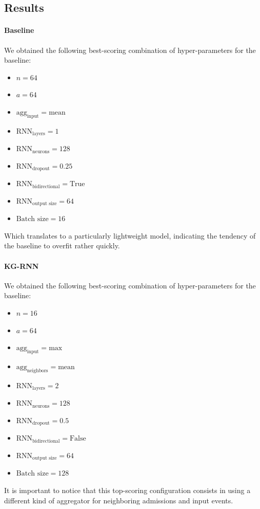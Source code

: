 \subsection{Results}
\paragraph{Baseline} We obtained the following best-scoring combination of hyper-parameters for the baseline:
\begin{itemize}
 \item $n = 64$
 \item $a = 64$
 \item $\mbox{agg}_{\mbox{input}} = \mbox{mean}$
 \item $\mbox{RNN}_{\mbox{layers}} = 1$
 \item $\mbox{RNN}_{\mbox{neurons}} = 128$
 \item $\mbox{RNN}_{\mbox{dropout}} = 0.25$
 \item $\mbox{RNN}_{\mbox{bidirectional}} = \mbox{True}$
 \item $\mbox{RNN}_{\mbox{output size}} = 64$
 \item $\mbox{Batch size} = 16$
\end{itemize}
Which translates to a particularly lightweight model, indicating the tendency of the baseline to overfit rather quickly.
\paragraph{KG-RNN} We obtained the following best-scoring combination of hyper-parameters for the baseline:
\begin{itemize}
 \item $n = 16$
 \item $a = 64$
 \item $\mbox{agg}_{\mbox{input}} = \mbox{max}$
 \item $\mbox{agg}_{\mbox{neighbors}} = \mbox{mean}$
 \item $\mbox{RNN}_{\mbox{layers}} = 2$
 \item $\mbox{RNN}_{\mbox{neurons}} = 128$
 \item $\mbox{RNN}_{\mbox{dropout}} = 0.5$
 \item $\mbox{RNN}_{\mbox{bidirectional}} = \mbox{False}$
 \item $\mbox{RNN}_{\mbox{output size}} = 64$
 \item $\mbox{Batch size} = 128$
\end{itemize}
It is important to notice that this top-scoring configuration consists in using a different kind of aggregator for neighboring admissions and input events. \\

